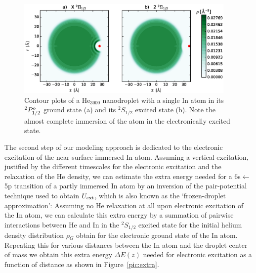 \documentclass[twoside,twocolumn,9pt]{article}
\begin{document}
\begin{figure}[htbp!]
  	\begin{center}
 		\includegraphics[width=0.95\textwidth]{5.eps}
                \caption{Contour plots of a He$_3000$ nanodroplet with a single In atom in its $^2P^{\rm o}_{1/2}$ ground state (a) and its $^2S_{1/2}$ excited state (b). Note the almost complete immersion of the atom in the electronically excited state.\label{pic:cont}}
  	\end{center}
\end{figure}

The second step of our modeling approach is dedicated to the electronic excitation of the near-surface immersed In atom. Assuming a vertical excitation, justified by the different timescales for the electronic excitation and the relaxation of the He density, we can estimate the extra energy needed for a 6s$\leftarrow{}$5p transition of a partly immersed In atom by an inversion of the pair-potential technique used to obtain $U_{ \rm ext}$, which is also known as the `frozen-droplet approximation': Assuming no He relaxation at all upon electronic excitation of the In atom, we can calculate this extra energy by a summation of pairwise interactions between He and In in the $^2S_{1/2}$ excited state for the initial helium density distribution $\rho{}_G$ obtain for the electronic ground state of the In atom. Repeating this for various distances between the In atom and the droplet center of mass we obtain this extra energy $\Delta{}E(z)$ needed for electronic excitation as a function of distance as shown in Figure~\ref{pic:extra}.
\end{document}
